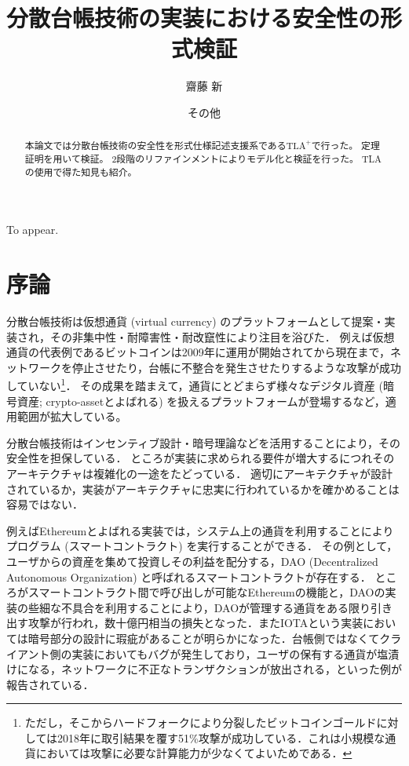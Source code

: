 \documentclass{fose2019}           %
\title{分散台帳技術の実装における安全性の形式検証}
\author{齋藤 新}{Shin Saito, IBM Research--Tokyo}
\author{その他}{Others, other}
\newcommand{\TLA}{$\text{TLA}^{+}$}
\begin{document}
\maketitle

\begin{abstract}
本論文では分散台帳技術の安全性を形式仕様記述支援系である\TLA で行った。
定理証明を用いて検証。
2段階のリファインメントによりモデル化と検証を行った。
TLAの使用で得た知見も紹介。
\end{abstract}
\begin{eabstract}
To appear.
\end{eabstract}

\section{序論}

分散台帳技術は仮想通貨 (virtual currency) のプラットフォームとして提案・実装され，その非集中性・耐障害性・耐改竄性により注目を浴びた．
例えば仮想通貨の代表例であるビットコイン\cite{nakamoto:bitcoin}は2009年に運用が開始されてから現在まで，ネットワークを停止させたり，台帳に不整合を発生させたりするような攻撃が成功していない\footnote{ただし，そこからハードフォークにより分裂したビットコインゴールドに対しては2018年に取引結果を覆す51\%攻撃が成功している．これは小規模な通貨においては攻撃に必要な計算能力が少なくてよいためである．}．
その成果を踏まえて，通貨にとどまらず様々なデジタル資産 (暗号資産; crypto-assetとよばれる) を扱えるプラットフォーム\cite{ethereum}が登場するなど，適用範囲が拡大している。

分散台帳技術はインセンティブ設計・暗号理論などを活用することにより，その安全性を担保している．
ところが実装に求められる要件が増大するにつれそのアーキテクチャは複雑化の一途をたどっている．
適切にアーキテクチャが設計されているか，実装がアーキテクチャに忠実に行われているかを確かめることは容易ではない．

例えばEthereumとよばれる実装では，システム上の通貨を利用することによりプログラム (スマートコントラクト) を実行することができる．
その例として，ユーザからの資産を集めて投資しその利益を配分する，DAO (Decentralized Autonomous Organization) と呼ばれるスマートコントラクトが存在する．
ところがスマートコントラクト間で呼び出しが可能なEthereumの機能と，DAOの実装の些細な不具合を利用することにより，DAOが管理する通貨をある限り引き出す攻撃が行われ，数十億円相当の損失となった\cite{dao:codetour}．またIOTAという実装においては暗号部分の設計に瑕疵があることが明らかになった\cite{iota}．台帳側ではなくてクライアント側の実装においてもバグが発生しており，ユーザの保有する通貨が塩漬けになる，ネットワークに不正なトランザクションが放出される，といった例が報告されている．
\end{document}
